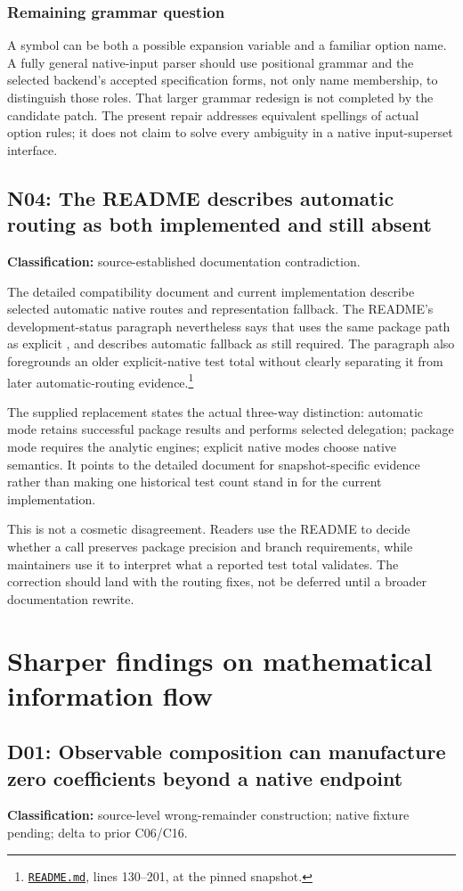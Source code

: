 \documentclass[11pt,letterpaper]{article}
\newcommand{\code}[1]{\texttt{\detokenize{#1}}}
\newcommand{\sr}[3]{\footnote{\href{https://github.com/VladimirReshetnikov/Asymptotic/blob/6687962f3c858a4f93623cfc496f33e35c6763d4/#1\#L#2-L#3}{\nolinkurl{#1}}, lines #2--#3, at the pinned snapshot.}}
\newcommand{\finding}[3]{\subsection{#1: #2}\textbf{Classification:} #3.\par}
\begin{document}
\subsubsection*{Remaining grammar question}

A symbol can be both a possible expansion variable and a familiar option name. A fully general native-input parser should use positional grammar and the selected backend's accepted specification forms, not only name membership, to distinguish those roles. That larger grammar redesign is not completed by the candidate patch. The present repair addresses equivalent spellings of actual option rules; it does not claim to solve every ambiguity in a native input-superset interface.

\finding{N04}{The README describes automatic routing as both implemented and still absent}{source-established documentation contradiction}

The detailed compatibility document and current implementation describe selected automatic native routes and representation fallback. The README's development-status paragraph nevertheless says that \code{Automatic} uses the same package path as explicit \code{"Package"}, and describes automatic fallback as still required. The paragraph also foregrounds an older explicit-native test total without clearly separating it from later automatic-routing evidence.\sr{README.md}{130}{201}\cite{nativeplan}

The supplied replacement states the actual three-way distinction: automatic mode retains successful package results and performs selected delegation; package mode requires the analytic engines; explicit native modes choose native semantics. It points to the detailed document for snapshot-specific evidence rather than making one historical test count stand in for the current implementation.

This is not a cosmetic disagreement. Readers use the README to decide whether a call preserves package precision and branch requirements, while maintainers use it to interpret what a reported test total validates. The correction should land with the routing fixes, not be deferred until a broader documentation rewrite.

\section{Sharper findings on mathematical information flow}

\finding{D01}{Observable composition can manufacture zero coefficients beyond a native endpoint}{source-level wrong-remainder construction; native fixture pending; delta to prior C06/C16}
\end{document}
